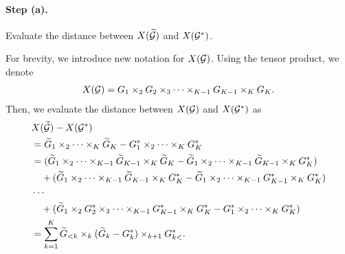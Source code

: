 \paragraph{Step (a).} Evaluate the distance between $X(\widetilde {\mathcal{G}})$ and $X(\mathcal{G}^*)$.


For brevity, we introduce new notation for $X(\mathcal{G})$.
Using the tensor product, we denote
\begin{align*}
	X(\mathcal{G}) = G_1 \times_2 G_2 \times_3 \cdots \times_{K-1} G_{K-1} \times_K G_K.
\end{align*}
Then, we evaluate the distance between $X(\mathcal{G})$ and $X(\mathcal{G}^*)$ as
\begin{align*}
	&X(\widetilde{\mathcal{G}}) - X(\mathcal{G}^*)\\
	&=\widetilde G_1 \times_2 \cdots \times_K \widetilde G_K - G_1^* \times_2 \cdots \times_K G_K^* \\
	&=(\widetilde G_1 \times_2 \cdots \times_{K-1} \widetilde G_{K-1}\times_K \widetilde G_K - \widetilde G_1 \times_2 \cdots \times_{K-1} \widetilde G_{K-1} \times_K G_K^*) \\
	& \quad + (\widetilde G_1 \times_2 \cdots \times_{K-1} \widetilde G_{K-1} \times_K G_K^* - \widetilde G_1 \times_2 \cdots \times_{K-1} G_{K-1}^* \times_K G_K^*) \\
	& \cdots \\
	& \quad +  (\widetilde G_1 \times_2 G_2^* \times _3\cdots \times_{K-1} G_{K-1}^* \times_K G_K^* - G_1^* \times_2 \cdots \times_K G_K^*) \\
	&= \sum_{k=1}^{K}  \widetilde G_{<k} \times_{k} (\widetilde G_{k} -  G_{k}^*) \times_{k+1}   G_{k<}^*.
\end{align*}



